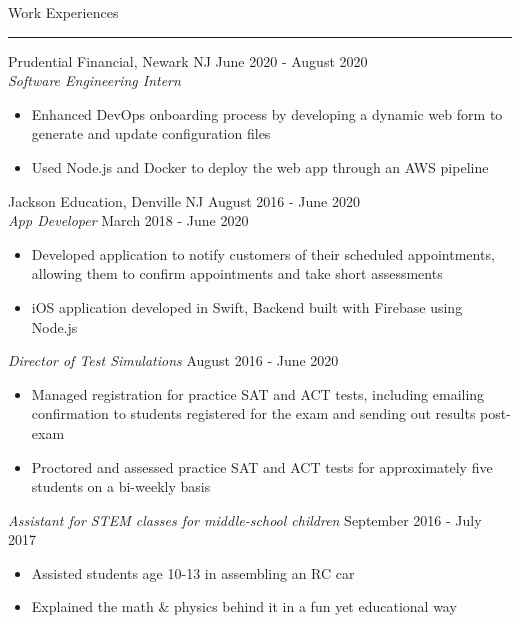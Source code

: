 \documentclass{article}
\newcommand \spacingBetweenHeadings {0.5em}
\begin{document}
\noindent
\huge Work Experiences\par
\vspace{0.1em}
\hrule
\Large
\vspace{1em}
\noindent
Prudential Financial, Newark NJ
\hfill
June 2020 - August 2020\\
\textit{Software Engineering Intern}\\
\vspace{-1em}
\begin{itemize}
\item Enhanced DevOps onboarding process by developing a dynamic web form to generate and update configuration files
\item Used Node.js and Docker to deploy the web app through an AWS pipeline
\end{itemize}
Jackson Education, Denville NJ
\hfill
August 2016 - June 2020\\
\textit{App Developer}
\hfill
March 2018 - June 2020\\
\vspace{-1em}
\begin{itemize}
\item Developed application to notify customers of their scheduled appointments, allowing them to \mbox{confirm} appointments and take short assessments
\item iOS application developed in Swift, Backend built with Firebase using Node.js
\end{itemize}
\textit{Director of Test Simulations}
\hfill
August 2016 - June 2020\\
\vspace{-1em}
\begin{itemize}
\item Managed registration for practice SAT and ACT tests, including emailing confirmation to students registered for the exam and sending out results post-exam
\item Proctored and assessed practice SAT and ACT tests for approximately five students on a bi-weekly basis
\end{itemize}
\textit{Assistant for STEM classes for middle-school children}
\hfill
September 2016 - July 2017
\begin{itemize}
\item Assisted students age 10-13 in assembling an RC car
\item Explained the math \& physics behind it in a fun yet educational way
\end{itemize}

\vspace{\spacingBetweenHeadings}
\end{document}
